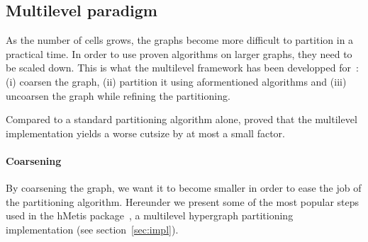 \documentclass[11pt,a4paper]{report} %
\theoremstyle{customdef}
\begin{document}
\subsection{Multilevel paradigm}\label{sec:mul-para}
As the number of cells grows, the graphs become more difficult to partition in a practical time.
In order to use proven algorithms on larger graphs, they need to be scaled down.
This is what the multilevel framework has been developped for~\citep{Karypis1995b}: (i) coarsen the graph, (ii) partition it using aformentioned algorithms and (iii) uncoarsen the graph while refining the partitioning.

Compared to a standard partitioning algorithm alone, \citet{Karypis1995a} proved that the multilevel implementation yields a worse cutsize by at most a small factor.





\paragraph{Coarsening}
By coarsening the graph, we want it to become smaller in order to ease the job of the partitioning algorithm.    
Hereunder we present some of the most popular steps used in the hMetis package~\citep{Karypis1999}, a multilevel hypergraph partitioning implementation (see section~\ref{sec:impl}).  
\end{document}
